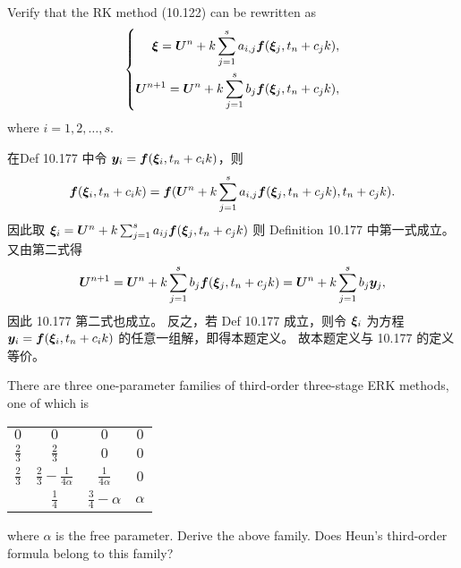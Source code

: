 \documentclass[lang=cn,a4paper,newtx,bibend=bibtex]{elegantpaper}
\begin{document}
\begin{prob}[Exercise 10.180]
  Verify that the RK method (10.122) can be rewritten as
  \begin{equation}
    \left\{
    \begin{aligned}
      \bm{\xi} = \bm{U}^n + k\sum_{j=1}^s a_{i,j}\bm{f}(\bm{\xi}_j, t_n+c_jk), \\
      \bm{U}^{n+1} = \bm{U}^n + k\sum_{j=1}^s b_j\bm{f}(\bm{\xi}_j, t_n+c_jk), \\
    \end{aligned}
    \right.
  \end{equation}
  where $i = 1, 2, \dots, s$.
\end{prob}

\begin{solution}
  在Def 10.177 中令 $\bm{y}_i = \bm{f}(\bm{\xi}_i, t_n+c_ik)$，则
  \begin{equation*}
    \bm{f}(\bm{\xi}_i, t_n+c_ik) = \bm{f}(\bm{U}^n + k\sum_{j=1}^s a_{i,j}\bm{f}(\bm{\xi}_j, t_n+c_jk), t_n+c_jk).
  \end{equation*}
  因此取 $\bm{\xi}_i = \bm{U}^n + k\sum_{j=1}^s a_{ij}\bm{f}(\bm{\xi}_j, t_n+c_jk)$
  则 Definition 10.177 中第一式成立。
  又由第二式得
  \begin{equation*}
    \bm{U}^{n+1} = \bm{U}^n + k\sum_{j=1}^s b_j\bm{f}(\bm{\xi}_j, t_n+c_jk) = \bm{U}^n + k\sum_{j=1}^s b_j\bm{y}_j,
  \end{equation*}
  因此 10.177 第二式也成立。
  反之，若 Def 10.177 成立，则令 $\bm{\xi}_i$ 为方程 $\bm{y}_i = \bm{f}(\bm{\xi}_i, t_n+c_ik)$ 的任意一组解，即得本题定义。
  故本题定义与 10.177 的定义等价。
\end{solution}

\begin{prob}[Exercise 10.187]
  There are three one-parameter families of
  third-order three-stage ERK methods,
  one of which is
  \begin{tabular}{c|ccc}
    $0$ & $0$ & $0$ & $0$ \\
    $\frac 23$ & $\frac 23$ & $0$ & $0$ \\
    $\frac 23$ & $\frac 23 - \frac{1}{4\alpha}$ & $\frac{1}{4\alpha}$ & $0$ \\
    \hline
    & $\frac 14$ & $\frac 34 - \alpha$ & $\alpha$ \\
  \end{tabular}
  where $\alpha$ is the free parameter.
  Derive the above family.
  Does Heun's third-order formula belong to this family?
\end{prob}
\end{document}
